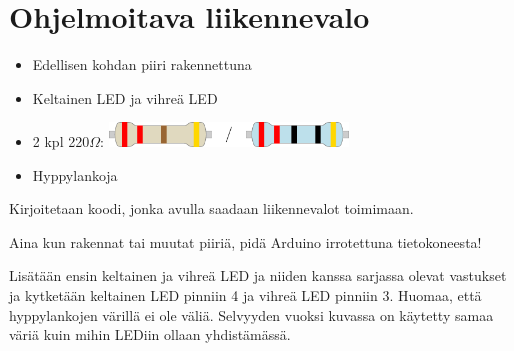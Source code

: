 \section{Ohjelmoitava liikennevalo}

\begin{tcolorbox}[colback=lime!10,title=Tarvikkeet, colbacktitle=green!10,coltitle=black]
\begin{itemize}
    \item Edellisen kohdan piiri rakennettuna
    \item Keltainen LED ja vihreä LED
    \item 2 kpl 220$\Omega$: \includegraphics[width=0.5\textwidth]{kuvat/220.pdf}
    \item Hyppylankoja
\end{itemize}
\end{tcolorbox}


\begin{tcolorbox}[colback=blue!10,title=Piirin toiminta,colbacktitle=purple!90]
Kirjoitetaan koodi, jonka avulla saadaan liikennevalot toimimaan.
\tcblower
\begin{center}
\end{center}
\end{tcolorbox}


\begin{tcolorbox}[colback=red!10,colbacktitle=red,title=HUOM!]
Aina kun rakennat tai muutat piiriä, pidä Arduino irrotettuna tietokoneesta! 
\end{tcolorbox}

Lisätään ensin keltainen ja vihreä LED ja niiden kanssa sarjassa olevat vastukset ja kytketään keltainen LED pinniin 4 ja vihreä LED pinniin 3. Huomaa, että hyppylankojen värillä ei ole väliä. Selvyyden vuoksi kuvassa on käytetty samaa väriä kuin mihin LEDiin ollaan yhdistämässä.

